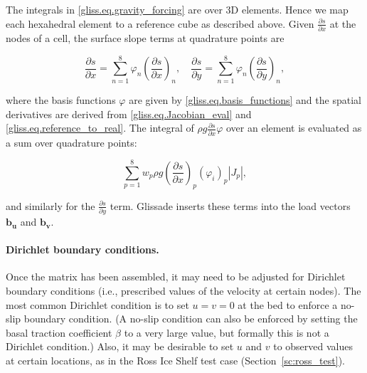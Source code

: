 {The integrals in \eqref{gliss.eq.gravity_forcing} are over 3D elements.
Hence we map each hexahedral element to a reference cube as described above. 
Given $\frac{\partial s}{\partial x}$ at the nodes of a cell,
the surface slope terms at quadrature points are

\begin{equation}
  \frac{\partial s}{\partial x} = \sum\limits_{n=1}^{8}{{{\varphi }_{n}}}{{\left( \frac{\partial s}{\partial x} \right)}_{n}}, \quad
  \frac{\partial s}{\partial y} = \sum\limits_{n=1}^{8}{{{\varphi }_{n}}}{{\left( \frac{\partial s}{\partial y} \right)}_{n}},
\end{equation}

\noindent
where the basis functions $\varphi$ are given by \eqref{gliss.eq.basis_functions}
and the spatial derivatives are derived from \eqref{gliss.eq.Jacobian_eval} and \eqref{gliss.eq.reference_to_real}.
The integral of $\rho g \frac{\partial s}{\partial x} \varphi$
over an element is evaluated as a sum over quadrature points:

\begin{equation}
  \label{gliss.eq.sum_over_qp_gravity}
  \sum\limits_{p=1}^{8} { w_p \rho g \left(\frac{\partial s}{\partial x}\right)_p (\varphi_i)_p |J_p|},
\end{equation}

\noindent
and similarly for the $\frac{\partial s}{\partial y}$ term.
Glissade inserts these terms into the load vectors $\mathbf{b_u}$ and $\mathbf{b_v}$.

\paragraph{Dirichlet boundary conditions.}

Once the matrix has been assembled, it may need to be adjusted for Dirichlet boundary conditions
(i.e., prescribed values of the velocity at certain nodes). The most common Dirichlet condition
is to set $u = v = 0$ at the bed to enforce a no-slip boundary condition.  (A no-slip condition
can also be enforced by setting the basal traction coefficient $\beta$
to a very large value, but formally this is not a Dirichlet condition.)  Also, it may be desirable to
set $u$ and $v$ to observed values at certain locations, as in the Ross Ice Shelf test case
(Section~\ref{sc:ross_test}).

}
